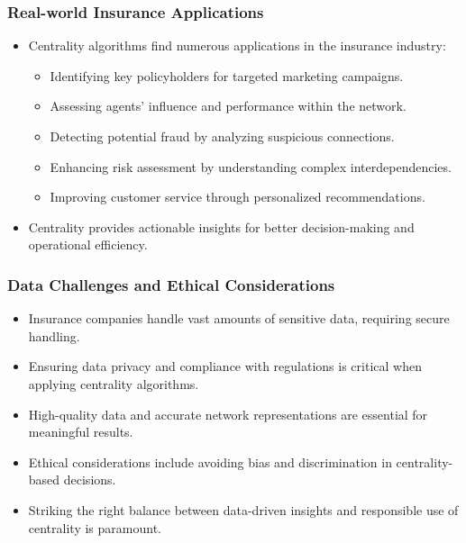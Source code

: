 \begin{frame}[fragile]\frametitle{Real-world Insurance Applications}
\begin{itemize}
\item Centrality algorithms find numerous applications in the insurance industry:
\begin{itemize}
\item Identifying key policyholders for targeted marketing campaigns.
\item Assessing agents' influence and performance within the network.
\item Detecting potential fraud by analyzing suspicious connections.
\item Enhancing risk assessment by understanding complex interdependencies.
\item Improving customer service through personalized recommendations.
\end{itemize}
\item Centrality provides actionable insights for better decision-making and operational efficiency.
\end{itemize}
\end{frame}

\begin{frame}[fragile]\frametitle{Data Challenges and Ethical Considerations}
\begin{itemize}
\item Insurance companies handle vast amounts of sensitive data, requiring secure handling.
\item Ensuring data privacy and compliance with regulations is critical when applying centrality algorithms.
\item High-quality data and accurate network representations are essential for meaningful results.
\item Ethical considerations include avoiding bias and discrimination in centrality-based decisions.
\item Striking the right balance between data-driven insights and responsible use of centrality is paramount.
\end{itemize}
\end{frame}

